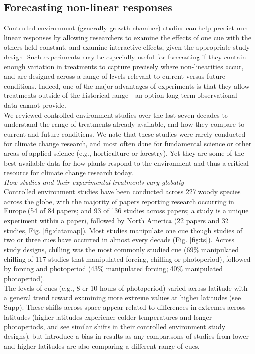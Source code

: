 \documentclass[11pt,letter]{article}
\begin{document}
\subsection{Forecasting non-linear responses} %
Controlled environment (generally growth chamber) studies can help predict non-linear responses by allowing researchers to examine the effects of one cue with the others held constant, and examine interactive effects, given the appropriate study design. Such experiments may be especially useful for forecasting if they contain enough variation in treatments to capture precisely where non-linearities occur, and are designed across a range of levels relevant to current versus future conditions. Indeed, one of the major advantages of experiments is that they allow treatments outside of the historical range---an option long-term observational data cannot provide. \\

We reviewed controlled environment studies over the last seven decades to understand the range of treatments already available, and how they compare to current and future conditions. We note that these studies were rarely conducted for climate change research, and most often done for fundamental science or other areas of applied science (e.g., horticulture or forestry). Yet they are some of the best available data for how plants respond to the environment and thus a critical resource for climate change research today.\\

\emph{How studies and their experimental treatments vary globally}\\
Controlled environment studies have been conducted across 227 woody species across the globe, with the majority of papers reporting research occurring in Europe (54 of 84 papers; and 93 of 136 studies across papers; a study is a unique experiment within a paper), followed by North America (22 papers and 32 studies, Fig. \ref{fig:datamap}). Most studies manipulate one cue though studies of two or three cues have occurred in almost every decade (Fig. \ref{fig:ts}). Across study designs, chilling was the most commonly studied cue (69\% manipulated chilling of 117 studies that manipulated forcing, chilling or photoperiod), followed by forcing and photoperiod (43\% manipulated forcing; 40\% manipulated photoperiod). \\

The levels of cues (e.g., 8 or 10 hours of photoperiod) varied across latitude with a general trend toward examining more extreme values at higher latitudes (see Supp). These shifts across space appear related to differences in extremes across latitudes (higher latitudes experience colder temperatures and longer photoperiods, and see similar shifts in their controlled environment study designs), but introduce a bias in results as any comparisons of studies from lower and higher latitudes are also comparing a different range of cues. \\
\end{document}

